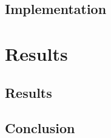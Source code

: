 \documentclass[twoside,english]{uiofysmaster}
\numberwithin{equation}{section} %
\begin{document}
		\chapter{Implementation}
			
			

	\part{Results}
		\chapter{Results}
			
			
			
			
			
		\chapter{Conclusion}
		
	
	\begin{appendices}
		
		
	\end{appendices}

	
	
\end{document}
